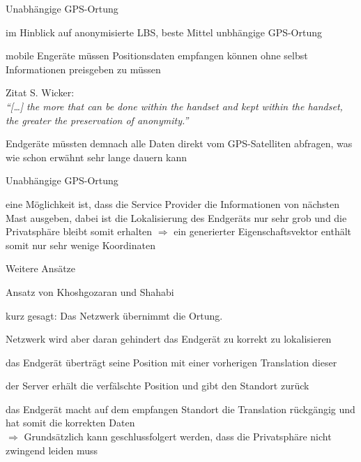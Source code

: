 \begin{frame}{Unabhängige GPS-Ortung}
\itemize
  \item im Hinblick auf anonymisierte LBS, beste Mittel unbhängige GPS-Ortung
  \item mobile Engeräte müssen Positionsdaten empfangen können ohne selbst Informationen preisgeben zu müssen
  \item Zitat S. Wicker:\\ \vspace{.2cm}
  \textit{"`[\dots] the more that can be done within the handset and kept within the handset, the greater the preservation of anonymity."'}\vspace{.2cm}
  \item Endgeräte müssten demnach alle Daten direkt vom GPS-Satelliten abfragen, was wie schon erwähnt sehr lange dauern kann
\enditemize
\end{frame}

\begin{frame}{Unabhängige GPS-Ortung}
\itemize
  \item eine Möglichkeit ist, dass die Service Provider die Informationen von nächsten Mast ausgeben, dabei ist die Lokalisierung des Endgeräts nur sehr grob und die Privatsphäre bleibt somit erhalten $\Rightarrow$ ein generierter Eigenschaftsvektor enthält somit nur sehr wenige Koordinaten
\enditemize
\end{frame}

\begin{frame}{Weitere Ansätze}
\itemize
  \item Ansatz von Khoshgozaran und Shahabi
  \item kurz gesagt: Das Netzwerk übernimmt die Ortung.
  \item Netzwerk wird aber daran gehindert das Endgerät zu korrekt zu lokalisieren
  \item das Endgerät überträgt seine Position mit einer vorherigen Translation dieser
  \item der Server erhält die verfälschte Position und gibt den Standort zurück
  \item das Endgerät macht auf dem empfangen Standort die Translation rückgängig und hat somit die korrekten Daten\\ \vspace{.2cm}
  \hspace{-0.5cm}$\Longrightarrow$ Grundsätzlich kann geschlussfolgert werden, dass die Privatsphäre nicht zwingend leiden muss
\enditemize
\end{frame}

